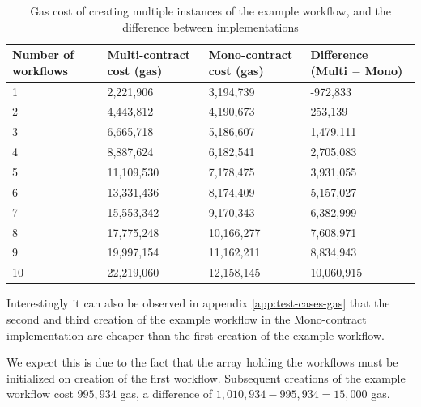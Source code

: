 \documentclass{article}
\begin{document}
	\begin{table}[]
		\centering
		\label{tab:cost-of-creating-multiple-workflows}
		\begin{tabular}{|p{2.5cm}|p{2.5cm}|p{2.5cm}|p{2.5cm}|}
			\hline
			Number of workflows & Multi-contract cost (gas) & Mono-contract cost (gas) 	& Difference (Multi $-$ Mono)   \\\hline
			1                   & 2,221,906                 & 3,194,739                 & -972,833          			\\\hline
			2                   & 4,443,812                 & 4,190,673                 & 253,139          				\\\hline
			3                   & 6,665,718                 & 5,186,607                 & 1,479,111          			\\\hline
			4                   & 8,887,624                 & 6,182,541                 & 2,705,083          			\\\hline
			5                   & 11,109,530                & 7,178,475                 & 3,931,055          			\\\hline
			6                   & 13,331,436                & 8,174,409                 & 5,157,027          			\\\hline
			7                   & 15,553,342                & 9,170,343                 & 6,382,999          			\\\hline
			8                   & 17,775,248                & 10,166,277                & 7,608,971          			\\\hline
			9                   & 19,997,154                & 11,162,211                & 8,834,943          			\\\hline
			10                  & 22,219,060                & 12,158,145                & 10,060,915          			\\\hline
		\end{tabular}      
		\caption{Gas cost of creating multiple instances of the example workflow, and the difference between implementations}
	\end{table}

	Interestingly it can also be observed in appendix \ref{app:test-cases-gas} that the second and third creation of the example workflow in the Mono-contract implementation are cheaper than the first creation of the example workflow.

	We expect this is due to the fact that the array holding the workflows must be initialized on creation of the first workflow.
	Subsequent creations of the example workflow cost $995,934$ gas, a difference of $1,010,934 - 995,934 = 15,000$ gas.	
\end{document}
